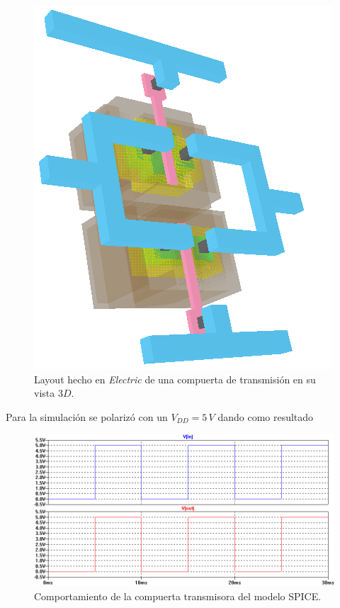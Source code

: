 \documentclass[twocolumn]{IEEEtran}
\begin{document}
\begin{figure}[H]
  \centering
    \includegraphics[scale=0.35]{pics/trans3d.png}
      \caption{Layout hecho en \textit{Electric} de una compuerta de transmisión en su vista $3D$.}
	\label{fig2}
\end{figure}
\noindent
Para la simulación se polarizó con un $V_{DD} = 5\, V$ dando como resultado
\begin{figure}[H]
  \centering
    \includegraphics[scale=0.3]{pics/outtrans.png}
      \caption{Comportamiento de la compuerta transmisora del modelo SPICE.}
	\label{outinv}
\end{figure}
\end{document}
